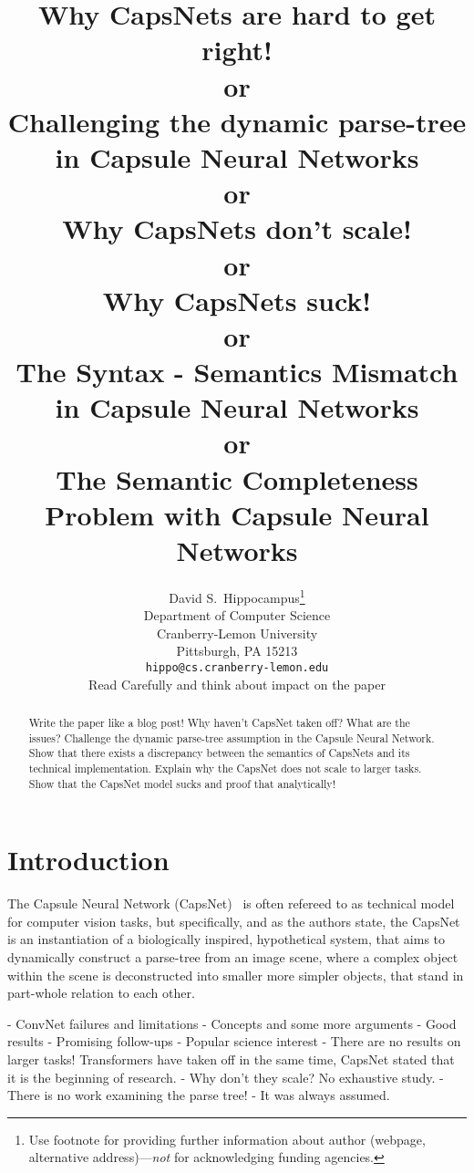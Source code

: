 \documentclass{article}
\title{                                                                                                    \large                                     
	Why CapsNets are hard to get right! \\
	or \\
	Challenging  the dynamic parse-tree in Capsule Neural Networks \\
	or \\
	Why CapsNets don't scale! \\
	or \\
	Why CapsNets suck! \\
	or \\
	The Syntax - Semantics Mismatch in Capsule Neural Networks
	\\
	or \\
	The Semantic Completeness Problem with Capsule Neural Networks
}
\author{%
  David S.~Hippocampus\thanks{Use footnote for providing further information
    about author (webpage, alternative address)---\emph{not} for acknowledging
    funding agencies.} \\
  Department of Computer Science\\
  Cranberry-Lemon University\\
  Pittsburgh, PA 15213 \\
  \texttt{hippo@cs.cranberry-lemon.edu} \\Read Carefully and think about impact on the paper
}
\begin{document}
\maketitle

\begin{abstract}
  Write the paper like a blog post!
  Why haven't CapsNet taken off?
  What are the issues?
  Challenge the dynamic parse-tree assumption in the Capsule Neural Network.
  Show that there exists a discrepancy between the semantics of CapsNets and its technical implementation.
  Explain why the CapsNet does not scale to larger tasks.
  Show that the CapsNet model sucks and proof that analytically!
\end{abstract}

\begin{comment}
	TODO
	- Think about motivation for parse trees, then motivate experiements accordingly
	- Add better less exhaustive introduction
	- Rework related work
	\url{https://en.wikipedia.org/wiki/Completeness_(logic)}
	
	TODO Meta:
	- Argument around Syntax and Semantics like with logical Systems
	- Choose a central argument that builds the core of the overall argumentation line
	- Build everythign else around that argument.
	
	IDEA:
	- Title in parse-tree form
\end{comment}
\section{Introduction}


The Capsule Neural Network (CapsNet)~\cite{nips/SabourFH17} is often refereed to as technical model for computer vision tasks, but specifically, and as the authors state, the CapsNet is an instantiation of a biologically inspired, hypothetical system, that aims to dynamically construct a parse-tree from an image scene, where a complex object within the scene is deconstructed into smaller more simpler objects, that stand in part-whole relation to each other.

- ConvNet failures and limitations
- Concepts and some more arguments
- Good results
- Promising follow-ups
- Popular science interest
- There are no results on larger tasks! Transformers have taken off in the same time, CapsNet stated that it is the beginning of research.
- Why don't they scale? No exhaustive study.
- There is no work examining the parse tree!
- It was always assumed.
\end{document}
